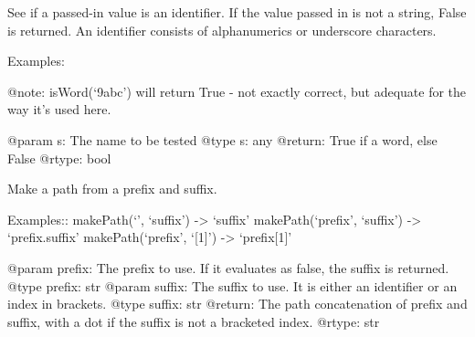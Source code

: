 \documentclass[a4paper,10pt,english]{sphinxmanual}
\begin{document}

\begin{fulllineitems}
\label{\detokenize{apidoc_src/src:src.pyconf.isWord}}
See if a passed-in value is an identifier. If the value passed in is not a
string, False is returned. An identifier consists of alphanumerics or
underscore characters.

Examples:

%
\begin{sphinxVerbatim}[commandchars=\\\{\}]
 
  
  
 
\end{sphinxVerbatim}

@note: isWord(‘9abc’) will return True - not exactly correct, but adequate
for the way it’s used here.

@param s: The name to be tested
@type s: any
@return: True if a word, else False
@rtype: bool

\end{fulllineitems}


\begin{fulllineitems}
\label{\detokenize{apidoc_src/src:src.pyconf.makePath}}
Make a path from a prefix and suffix.

Examples::
makePath(‘’, ‘suffix’) -\textgreater{} ‘suffix’
makePath(‘prefix’, ‘suffix’) -\textgreater{} ‘prefix.suffix’
makePath(‘prefix’, ‘{[}1{]}’) -\textgreater{} ‘prefix{[}1{]}’

@param prefix:  The prefix to use. If it evaluates as false, the suffix is returned.
@type prefix:   str
@param suffix:  The suffix to use. It is either an identifier or an index in brackets.
@type suffix:   str
@return:        The path concatenation of prefix and suffix, with a dot if the suffix is not a bracketed index.
@rtype:         str

\end{fulllineitems}
\end{document}
